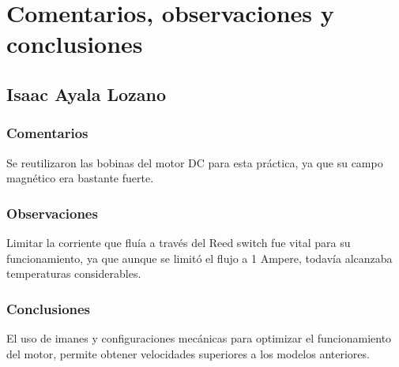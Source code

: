 \section{Comentarios, observaciones y conclusiones}
\subsection{Isaac Ayala Lozano}
\subsubsection{Comentarios}
Se reutilizaron las bobinas del motor DC para esta pr\'actica, ya que su campo magn\'etico era bastante fuerte.

\subsubsection{Observaciones}
Limitar la corriente que flu\'ia a trav\'es del Reed switch fue vital para su funcionamiento, ya que aunque se limit\'o el flujo
a 1 Ampere, todav\'ia alcanzaba temperaturas considerables.

\subsubsection{Conclusiones}
El uso de imanes y configuraciones mec\'anicas para optimizar el funcionamiento del motor, permite obtener velocidades superiores
a los modelos anteriores.